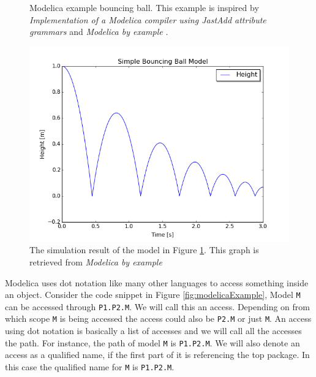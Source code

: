 \documentclass{cslthse-msc}
\begin{document}
\begin{figure}[!htbp]
    \centering
    
    \caption{Modelica example bouncing ball. This example is inspired by \textit{Implementation of a Modelica compiler using JastAdd attribute grammars} \cite{aakesson2010implementation} and \textit{Modelica by example} \cite{tillermodelica}.}
    \label{fig:bouncingBallCode}
\end{figure}

\begin{figure}[!htbp]
    \centering
    \includegraphics[width=1.0\textwidth]{Pictures/BB1.png}
    \caption{The simulation result of the model in Figure \ref{fig:bouncingBallCode}. This graph is retrieved from \textit{Modelica by example} \cite{tillermodelica}}
    \label{fig:bouncingBallSimulation}
\end{figure}

Modelica uses dot notation like many other languages to access something inside an object. Consider the code snippet in Figure \ref{fig:modelicaExample}, Model \texttt{M} can be accessed through \texttt{P1.P2.M}. We will call this an access. Depending on from which scope \texttt{M} is being accessed the access could also be \texttt{P2.M} or just \texttt{M}. An access using dot notation is basically a list of accesses and we will call all the accesses the path. For instance, the path of model \texttt{M} is \texttt{P1.P2.M}. We will also denote an access as a qualified name, if the first part of it is referencing the top package. In this case the qualified name for \texttt{M} is \texttt{P1.P2.M}.
\end{document}
